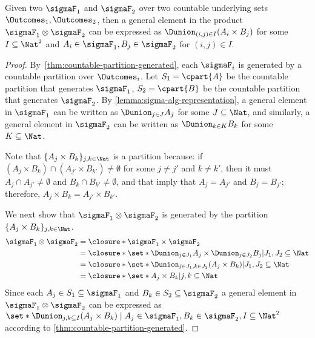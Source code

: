\begin{lemma}
 \label{lemma:product-algebra}
 Given two \salgebra[s] $\sigmaF_1$ and $\sigmaF_2$
 over two countable underlying sets $\Outcomes_1, \Outcomes_2$,
 then a general element in the product \salgebra{}
 $\sigmaF_1 \otimes \sigmaF_2$ can
 be expressed as $\Dunion_{(i, j) \in I} (A_{i} \times B_{j})$
 for some $I \subseteq \Nat^2$ and
 $A_{i} \in \sigmaF_{1}, B_{j} \in \sigmaF_{2}$ for $(i,j) \in I$.
\end{lemma}

 \begin{proof}
By~\cref{thm:countable-partition-generated}, each \salgebra{}
  $\sigmaF_i$ is generated by a countable partition over $\Outcomes_i$.
  Let $S_1 = \cpart{A}$ be the countable partition that generates $\sigmaF_1$,
  $S_2 = \cpart{B}$ be the countable partition that generates $\sigmaF_2$.
    By \cref{lemma:sigma-alg-representation},
    a general element in $\sigmaF_1$ can be written as
  $\Dunion_{j \in J} A_{j}$ for some $J \subseteq \Nat$,
  and similarly,
   a general element in $\sigmaF_2$ can be written as
  $\Dunion_{k \in K} B_{k}$ for some $K \subseteq \Nat$.

  Note that $\{A_j \times B_k \}_{j, k \in \Nat}$ is a partition because:
  if $(A_j \times B_k)  \cap (A_{j'} \times B_{k'}) \neq \emptyset$ for some
  $j \neq j'$ and $k \neq k'$,
  then it must $A_j \cap A_{j'} \neq \emptyset$ and $B_k \cap B_{k'} \neq \emptyset$,
  and that imply that $A_j =A_{j'}$ and $B_j =B_{j'}$;
  therefore, $A_j \times B_k = A_{j'} \times B_{k'}$.

  We next show that $\sigmaF_1 \otimes \sigmaF_2$ is generated by
  the partition $\{A_j \times B_k \}_{j, k \in \Nat}$.
\begin{align*}
   \sigmaF_1 \otimes \sigmaF_2
   &= \closure*{\sigmaF_1 \times \sigmaF_2} \\
   &= \closure*{\set*{\Dunion_{j \in J_1} A_{j} \times \Dunion_{j \in J_2} B_{j} | J_1, J_2 \subseteq \Nat}} \\
   &= \closure*{\set*{\Dunion_{j \in J_1, k \in J_2}  (A_{j} \times B_{k}) | J_1, J_2 \subseteq \Nat }} \\
   &= \closure*{\set*{ A_{j} \times B_{k} | j, k\subseteq \Nat }}
   \end{align*}
Since each $A_j \in S_1 \subseteq \sigmaF_1$ and $B_k \in S_2 \subseteq \sigmaF_2$
   a general element in $\sigmaF_1 \otimes \sigmaF_2$ can
  be expressed as $\set*{\Dunion_{j, k \subseteq I} (A_{j} \times B_{k}) \mid
  A_{j} \in \sigmaF_{1}, B_{k} \in \sigmaF_{2}, I \subseteq \Nat^2}$
according to \cref{thm:countable-partition-generated}.
 \end{proof}


